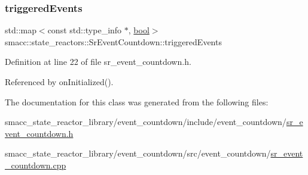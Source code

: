 \mbox{\label{classsmacc_1_1state__reactors_1_1SrEventCountdown_a6f9b3a51e8e8becbf76f99a5d0bcb8c5}} 
\subsubsection{\texorpdfstring{triggered\+Events}{triggeredEvents}}
{\footnotesize\ttfamily std\+::map$<$const std\+::type\+\_\+info $\ast$, \hyperlink{classbool}{bool}$>$ smacc\+::state\+\_\+reactors\+::\+Sr\+Event\+Countdown\+::triggered\+Events\hspace{0.3cm}{\ttfamily [private]}}



Definition at line 22 of file sr\+\_\+event\+\_\+countdown.\+h.



Referenced by on\+Initialized().



The documentation for this class was generated from the following files\+:\begin{DoxyCompactItemize}
\item 
smacc\+\_\+state\+\_\+reactor\+\_\+library/event\+\_\+countdown/include/event\+\_\+countdown/\hyperlink{sr__event__countdown_8h}{sr\+\_\+event\+\_\+countdown.\+h}\item 
smacc\+\_\+state\+\_\+reactor\+\_\+library/event\+\_\+countdown/src/event\+\_\+countdown/\hyperlink{sr__event__countdown_8cpp}{sr\+\_\+event\+\_\+countdown.\+cpp}\end{DoxyCompactItemize}
